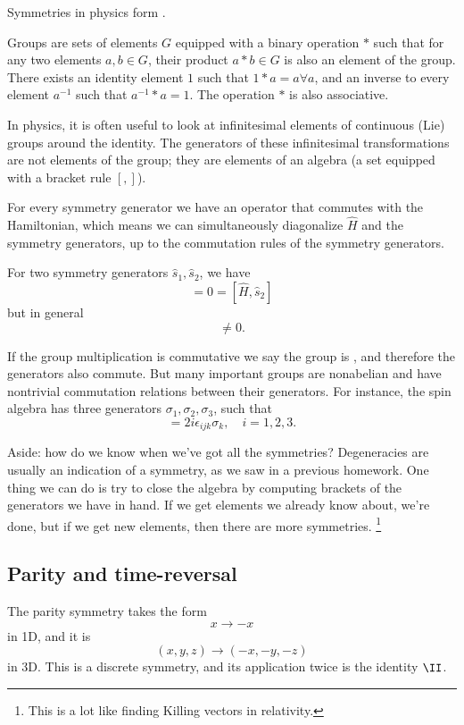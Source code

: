Symmetries in physics form .
\begin{defn}
    Groups are sets of elements $G$ equipped with a binary operation $*$ such that for any two elements $a,b\in G$, their product $a*b\in G$ is also an element of the group. There exists an identity element $1$ such that $1*a=a\forall a$, and an inverse to every element $a^{-1}$ such that $a^{-1}*a=1$. The operation $*$ is also associative.
\end{defn}

In physics, it is often useful to look at infinitesimal elements of continuous (Lie) groups around the identity. The generators of these infinitesimal transformations are not elements of the group; they are elements of an algebra (a set equipped with a bracket rule $[,]$).

For every symmetry generator we have an operator that commutes with the Hamiltonian, which means we can simultaneously diagonalize $\hat H$ and the symmetry generators, up to the commutation rules of the symmetry generators.

For two symmetry generators $\hat s_1, \hat s_2$, we have
\begin{equation}
    [\hat H, \hat s_1] = 0 = [\hat H, \hat s_2]
\end{equation}
but in general
\begin{equation}
    [\hat s_1, \hat s_2]\neq 0.
\end{equation}

If the group multiplication is commutative we say the group is , and therefore the generators also commute. But many important groups are nonabelian and have nontrivial commutation relations between their generators. For instance, the spin algebra has three generators $\sigma_1,\sigma_2,\sigma_3$, such that
\begin{equation}
    [\sigma_i,\sigma_j] = 2i\epsilon_{ijk} \sigma_k, \quad i=1,2,3.
\end{equation}

Aside: how do we know when we've got all the symmetries? Degeneracies are usually an indication of a symmetry, as we saw in a previous homework. One thing we can do is try to close the algebra by computing brackets of the generators we have in hand. If we get elements we already know about, we're done, but if we get new elements, then there are more symmetries.%
    \footnote{This is a lot like finding Killing vectors in relativity.}

\subsection*{Parity and time-reversal}
The parity symmetry takes the form
\begin{equation}
    x\to -x
\end{equation}
in 1D, and it is
\begin{equation}
    (x,y,z) \to (-x,-y,-z)
\end{equation}
in 3D.
This is a discrete symmetry, and its application twice is the identity $\II$.

